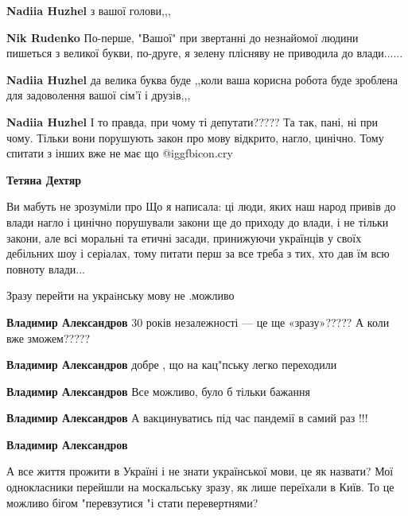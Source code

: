 \begin{itemize}
\begin{itemize}
\begin{itemize} %
\textbf{Nadiia Huzhel} з вашої голови,,,

\textbf{Nik Rudenko} По-перше, "Вашої" при звертанні до незнайомої людини пишеться з великої букви, по-друге, я зелену плісняву не приводила до влади......

\textbf{Nadiia Huzhel} да велика буква буде ,,коли ваша корисна робота буде зроблена для задоволення вашої сім'ї і друзів,,,

\textbf{Nadiia Huzhel} І то правда, при чому ті депутати????? Та так, пані, ні при чому. Тільки вони порушують закон про мову відкрито, нагло, цинічно. Тому спитати з інших вже не має що  @igg{fbicon.cry} 

\textbf{Тетяна Дехтяр} 

Ви мабуть не зрозуміли про Що я написала: ці люди, яких наш народ привів до
влади нагло і цинічно порушували закони ще до приходу до влади, і не тільки
закони, але всі моральні та етичні засади, принижуючи українців у своїх
дебільних шоу і серіалах, тому питати перш за все треба з тих, хто дав їм всю
повноту влади...

\end{itemize} %

\end{itemize} %

Зразу перейти на украiнську мову не .можливо

\begin{itemize} %
\textbf{Владимир Александров} 30 років незалежності — це ще «зразу»????? А коли вже зможем?????

\textbf{Владимир Александров} добре , що на кац"пську легко переходили

\textbf{Владимир Александров} Все можливо, було б тільки бажання

\textbf{Владимир Александров} А вакцинуватись під час пандемії в самий раз !!!

\textbf{Владимир Александров} 

А все життя прожити в Україні і не знати української мови, це як назвати? Мої
однокласники перейшли на москальську зразу, як лише переїхали в Київ. То це
можливо бігом "перевзутися "і стати перевертнями?

\end{itemize} %


\end{itemize}
